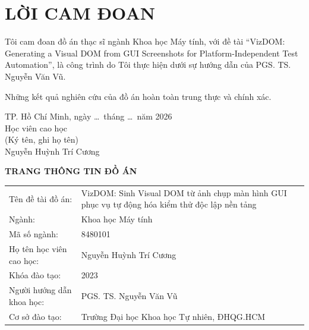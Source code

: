 \documentclass[11pt,a4paper]{article}
\newcommand{\thesistitle}{VizDOM: Generating a Visual DOM from GUI Screenshots
  for Platform-Independent Test Automation}
\newcommand{\thesistitleVI}{VizDOM: Sinh Visual DOM từ ảnh chụp màn hình GUI phục vụ
  tự động hóa kiểm thử độc lập nền tảng}
\begin{document}

\section*{\centering LỜI CAM ĐOAN}
\vspace{1em}
{\setlength{\parindent}{1.5em}\setlength{\parskip}{0.8em}
\indent Tôi cam đoan đồ án thạc sĩ ngành Khoa học Máy tính, với đề tài
``\thesistitle'', là công trình do Tôi thực hiện dưới sự hướng dẫn của
PGS. TS. Nguyễn Văn Vũ.

Những kết quả nghiên cứu của đồ án hoàn toàn trung thực và chính xác.\par}

\vspace{2.5em}
\hfill
\begin{minipage}{0.6\textwidth}
\centering
TP. Hồ Chí Minh, ngày \ldots\ tháng \ldots\ năm 2026\\[0.4em]
Học viên cao học\\
(Ký tên, ghi họ tên)\\[4em]
Nguyễn Huỳnh Trí Cương
\end{minipage}
\newpage

\begin{center}
{\large\bfseries TRANG THÔNG TIN ĐỒ ÁN}
\end{center}

\begin{tabular}{@{}p{}@{}p{}@{}}
Tên đề tài đồ án: & \thesistitleVI\\
Ngành: & Khoa học Máy tính\\
Mã số ngành: & 8480101\\
Họ tên học viên cao học: & Nguyễn Huỳnh Trí Cương\\
Khóa đào tạo: & 2023\\
Người hướng dẫn khoa học: & PGS. TS. Nguyễn Văn Vũ\\
Cơ sở đào tạo: & Trường Đại học Khoa học Tự nhiên, ĐHQG.HCM
\end{tabular}
\end{document}
